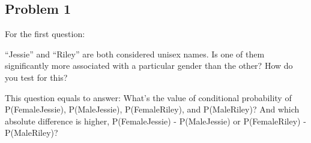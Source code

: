 \documentclass[11pt]{article}
\begin{document}
    \subsection{Problem 1}\label{problem-1}

For the first question:

``Jessie'' and ``Riley'' are both considered unisex names. Is one of
them significantly more associated with a particular gender than the
other? How do you test for this?

This question equals to answer: What's the value of conditional
probability of P(Female\textbar{}Jessie), P(Male\textbar{}Jessie),
P(Female\textbar{}Riley), and P(Male\textbar{}Riley)? And which absolute
difference is higher, \textbar{}P(Female\textbar{}Jessie) -
P(Male\textbar{}Jessie)\textbar{} or \textbar{}P(Female\textbar{}Riley)
- P(Male\textbar{}Riley)\textbar{}?
\end{document}
